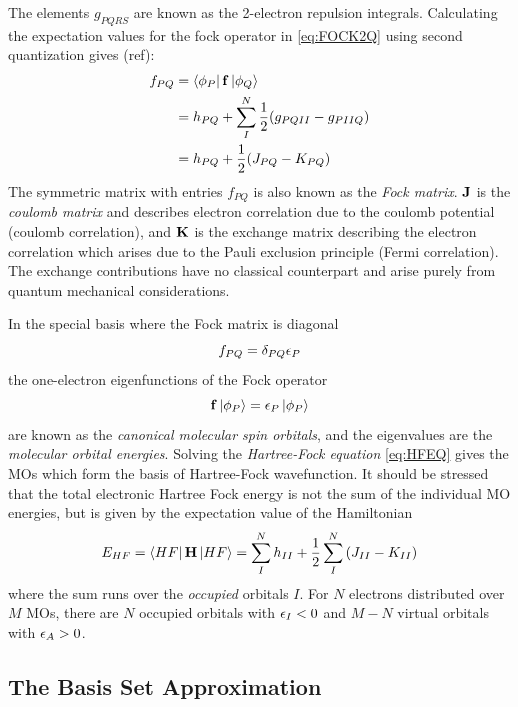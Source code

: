 \noindent The elements $g_{PQRS}$ are known as the 2-electron repulsion integrals. Calculating the expectation values for the fock operator in \ref{eq:FOCK2Q} using second quantization gives (ref):
\begin{equation}
\begin{split}
f_{PQ} &= \bra{\phi_P} \mathbf{f} \ket{\phi_Q} \\
	&= h_{PQ} + \sum_{I}^N \frac{1}{2} (g_{PQII} - g_{PIIQ}) \\
	&= h_{PQ} + \frac{1}{2} (J_{PQ} - K_{PQ})
\end{split}
\end{equation} 
\noindent The symmetric matrix with entries $f_{PQ}$ is also known as the \emph{Fock matrix}. $\mathbf{J}$ is the \emph{coulomb matrix} and describes electron correlation due to the coulomb potential (coulomb correlation), and $\mathbf{K}$ is the exchange matrix describing the electron correlation which arises due to the Pauli exclusion principle (Fermi correlation). The exchange contributions have no classical counterpart and arise purely from quantum mechanical considerations.

In the special basis where the Fock matrix is diagonal
\begin{equation}
f_{PQ} = \delta_{PQ} \epsilon_P 
\end{equation}
\noindent the one-electron eigenfunctions of the Fock operator 
\begin{equation}
\mathbf{f} \ket{\phi_P} = \epsilon_P \ket{\phi_P} 
\label{eq:HFEQ}
\end{equation} 
\noindent are known as the \emph{canonical molecular spin orbitals}, and the eigenvalues are the \emph{molecular orbital energies}. Solving the \emph{Hartree-Fock equation} \ref{eq:HFEQ} gives the MOs which form the basis of Hartree-Fock wavefunction. It should be stressed that the total electronic Hartree Fock energy is not the sum of the individual MO energies, but is given by the expectation value of the Hamiltonian 
\begin{equation}
E_{HF} = \bra{HF}\mathbf{H}\ket{HF} = \sum_{I}^{N} h_{II} + \frac{1}{2} \sum_{I}^{N} \left( J_{II} - K_{II} \right)   
\end{equation}
\noindent where the sum runs over the \emph{occupied} orbitals $I$. For $N$ electrons distributed over $M$ MOs, there are $N$ occupied orbitals with $\epsilon_I < 0$ and $M-N$ virtual orbitals with $\epsilon_A > 0$. 

\subsection{The Basis Set Approximation}

